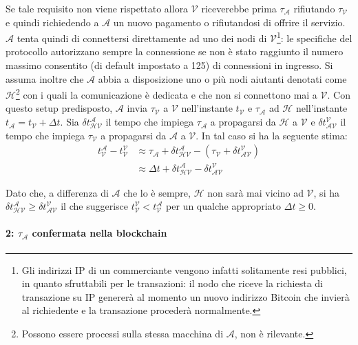 Se tale requisito non viene rispettato allora $\mathcal{V}$ riceverebbe prima $\tau_\mathcal{A}$ rifiutando $\tau_\mathcal{V}$ e quindi richiedendo a $\mathcal{A}$ un nuovo pagamento o rifiutandosi di offrire il servizio.\\
$\mathcal{A}$ tenta quindi di connettersi direttamente ad uno dei nodi di $\mathcal{V}$\footnote{Gli indirizzi IP di un commerciante vengono infatti solitamente resi pubblici, in quanto sfruttabili per le transazioni: il nodo che riceve la richiesta di transazione su IP genererà al momento un nuovo indirizzo Bitcoin che invierà al richiedente e la transazione procederà normalmente.}: le specifiche del protocollo autorizzano sempre la connessione se non è stato raggiunto il numero massimo consentito (di default impostato a 125) di connessioni in ingresso. Si assuma inoltre che $\mathcal{A}$ abbia a disposizione uno o più nodi aiutanti denotati come $\mathcal{H}$\footnote{Possono essere processi sulla stessa macchina di $\mathcal{A}$, non è rilevante.} con i quali la comunicazione è dedicata e che non si connettono mai a $\mathcal{V}$. Con questo setup predisposto, $\mathcal{A}$ invia $\tau_\mathcal{V}$ a $\mathcal{V}$ nell'instante $t_\mathcal{V}$ e $\tau_\mathcal{A}$ ad $\mathcal{H}$ nell'instante $t_\mathcal{A} = t_\mathcal{V} + \Delta t$. Sia $\delta t^\mathcal{A}_\mathcal{HV}$ il tempo che impiega $\tau_\mathcal{A}$ a propagarsi da $\mathcal{H}$ a $\mathcal{V}$ e $\delta t^\mathcal{V}_\mathcal{AV}$ il tempo che impiega $\tau_\mathcal{V}$ a propagarsi da $\mathcal{A}$ a $\mathcal{V}$. In tal caso si ha la seguente stima:
\begin{align*}
t^\mathcal{A}_\mathcal{V} - t^\mathcal{V}_\mathcal{V} &\approx \tau_\mathcal{A} + \delta t^\mathcal{A}_\mathcal{HV} - \left( \tau_\mathcal{V} + \delta t^\mathcal{V}_\mathcal{AV} \right) \\
&\approx \Delta t + \delta t^\mathcal{A}_\mathcal{HV} - \delta t^\mathcal{V}_\mathcal{AV}
\end{align*}

Dato che, a differenza di $\mathcal{A}$ che lo è sempre, $\mathcal{H}$ non sarà mai vicino ad $\mathcal{V}$, si ha $\delta t^\mathcal{A}_\mathcal{HV} \geq \delta t^\mathcal{V}_\mathcal{AV}$ il che suggerisce $t^\mathcal{V}_\mathcal{V} < t^\mathcal{A}_\mathcal{V}$ per un qualche appropriato $\Delta t \geq 0$.

\paragraph{2: $\tau_\mathcal{A}$ confermata nella blockchain}

